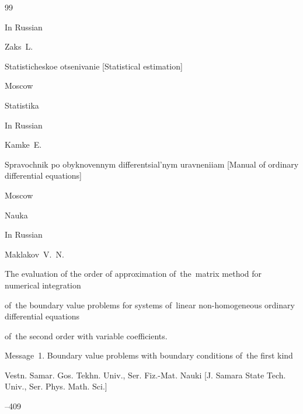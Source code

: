 \begin{thebibliography}{99}

\lang In Russian

\by Zaks~L.

\book Statisticheskoe otsenivanie \rm [Statistical estimation] 

\publaddr  Moscow

\publ Statistika










\lang In Russian

\by Kamke~E.

\book Spravochnik po obyknovennym differentsial'nym uravneniiam \rm  [Manual of ordinary differential equations]

\publaddr  Moscow

\publ Nauka








\lang In Russian

\by Maklakov~V.~N.

\paper The evaluation of the order of approximation of~the~matrix method for numerical integration

of~the boundary value problems for systems of~linear non-homogeneous ordinary differential equations

of~the second order with variable coefficients.

Message~1. Boundary value problems with boundary conditions of~the first kind

\jour Vestn. Samar. Gos. Tekhn. Univ., Ser. Fiz.-Mat. Nauki \rm  [J. Samara State Tech. Univ., Ser. Phys. Math. Sci.]




--409






\end{thebibliography}





\newpage



%

%

